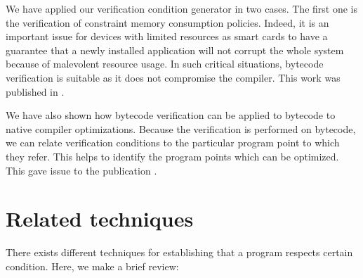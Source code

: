 We have applied our verification condition generator in two cases. The first one is the verification of constraint memory consumption policies.
 Indeed, it is an important issue for devices with limited resources as smart cards to have a guarantee that a newly installed application 
will not corrupt the whole system because of malevolent resource usage. In such critical situations, bytecode verification is suitable
as it does not compromise the compiler. This work was published in \cite{gmg05:sefm}.


We have also shown how bytecode verification can be applied to  bytecode to native compiler optimizations. Because the verification is performed
on bytecode, we can relate verification conditions to the particular program point to which they refer. This helps to identify
the program points which can be optimized. This gave issue to the publication \cite{DBLP:conf/cardis/CourbotPGV06}. 

\section{Related techniques}

There exists different techniques for establishing that a program respects certain condition. Here, we make a brief review:

